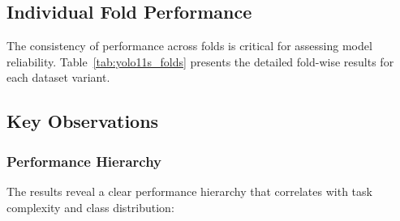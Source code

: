 \subsection{Individual Fold Performance}

The consistency of performance across folds is critical for assessing model reliability. Table~\ref{tab:yolo11s_folds} presents the detailed fold-wise results for each dataset variant.

\begin{table}[htbp]
\centering
\caption{YOLO11s Fold-Wise Performance (mAP50-95)}
\label{tab:yolo11s_folds}
\end{table}

\subsection{Key Observations}

\subsubsection{Performance Hierarchy}

The results reveal a clear performance hierarchy that correlates with task complexity and class distribution:


